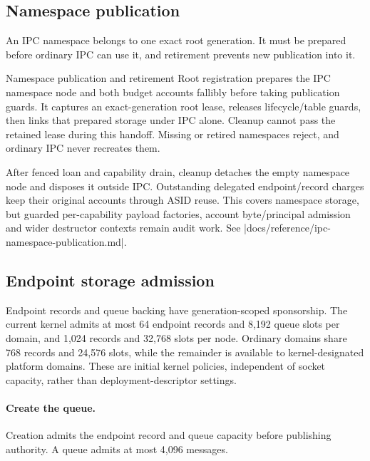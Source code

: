 \subsection{Namespace publication}

An IPC namespace belongs to one exact root generation. It must be prepared
before ordinary IPC can use it, and retirement prevents new publication into it.

\begin{implementationdetail}{Namespace publication and retirement}
Root registration prepares the IPC namespace node and both budget accounts
fallibly before taking publication guards. It captures an exact-generation
root lease, releases lifecycle/table guards, then links that prepared storage
under IPC alone. Cleanup cannot pass the retained lease during this handoff.
Missing or retired namespaces reject, and ordinary IPC never recreates them.

After fenced loan and capability drain, cleanup detaches the empty namespace
node and disposes it outside IPC. Outstanding delegated endpoint/record charges
keep their original accounts through ASID reuse. This covers namespace storage, but
guarded per-capability payload factories, account byte/principal
admission and wider destructor contexts remain audit work. See
\repofile|docs/reference/ipc-namespace-publication.md|.
\end{implementationdetail}

\subsection{Endpoint storage admission}

Endpoint records and queue backing have generation-scoped sponsorship. The
current kernel admits at most 64 endpoint records and 8,192 queue slots per
domain, and 1,024 records and 32,768 slots per node. Ordinary domains share
768 records and 24,576 slots, while the remainder is available to kernel-designated
platform domains. These are initial kernel policies, independent of socket
capacity, rather than deployment-descriptor settings.

\paragraph*{Create the queue.}

Creation admits the endpoint record and queue capacity before publishing authority.
A queue admits at most 4,096 messages.

